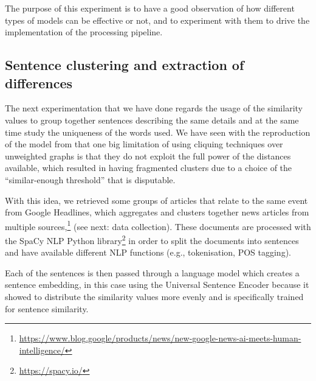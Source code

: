 The purpose of this experiment is to have a good observation of how different types of models can be effective or not, and to experiment with them to drive the implementation of the processing pipeline.


\subsection{Sentence clustering and extraction of differences}
The next experimentation that we have done regards the usage of the similarity values to group together sentences describing the same details and at the same time study the uniqueness of the words used.
We have seen with the reproduction of the model from \citet{bountouridis2018explaining} that one big limitation of using cliquing techniques over unweighted graphs is that they do not exploit the full power of the distances available, which resulted in having fragmented clusters due to a choice of the ``similar-enough threshold'' that is disputable.

With this idea, we retrieved some groups of articles that relate to the same event from Google Headlines, which aggregates and clusters together news articles from multiple sources,\footnote{\url{https://www.blog.google/products/news/new-google-news-ai-meets-human-intelligence/}} (see next: data collection).
These documents are processed with the SpaCy NLP Python library\footnote{\url{https://spacy.io/}} in order to split the documents into sentences and have available different NLP functions (e.g., tokenisation, POS tagging).

Each of the sentences is then passed through a language model which creates a sentence embedding, in this case using the Universal Sentence Encoder because it showed to distribute the similarity values more evenly and is specifically trained for sentence similarity.

